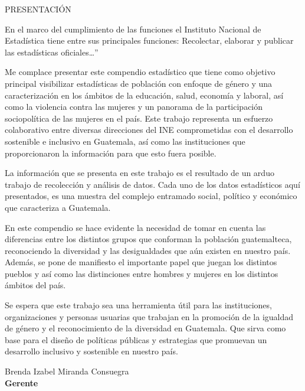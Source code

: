 \begin{center}
{\Bold \LARGE PRESENTACIÓN}\\[2cm]
\end{center}

En el marco del cumplimiento de las funciones el Instituto Nacional de Estadística tiene entre sus principales funciones: Recolectar, elaborar y publicar las estadísticas oficiales…”  

Me complace presentar este compendio estadístico que tiene como objetivo principal visibilizar estadísticas de población con enfoque de género y una caracterización en los ámbitos de la educación, salud, economía y laboral, así como la violencia contra las mujeres y un panorama de la participación sociopolítica de las mujeres en el país. Este trabajo representa un esfuerzo colaborativo entre diversas direcciones del INE comprometidas con el desarrollo sostenible e inclusivo en Guatemala, así como las instituciones que proporcionaron la información para que esto fuera posible. 

La información que se presenta en este trabajo es el resultado de un arduo trabajo de recolección y análisis de datos. Cada uno de los datos estadísticos aquí presentados, es una muestra del complejo entramado social, político y económico que caracteriza a Guatemala. 

En este compendio se hace evidente la necesidad de tomar en cuenta las diferencias entre los distintos grupos que conforman la población guatemalteca, reconociendo la diversidad y las desigualdades que aún existen en nuestro país. Además, se pone de manifiesto el importante papel que juegan los distintos pueblos y así como las distinciones entre hombres y mujeres en los distintos ámbitos del país. 

Se espera que este trabajo sea una herramienta útil para las instituciones, organizaciones y personas usuarias que trabajan en la promoción de la igualdad de género y el reconocimiento de la diversidad en Guatemala. Que sirva como base para el diseño de políticas públicas y estrategias que promuevan un desarrollo inclusivo y sostenible en nuestro país. 

\begin{center}
Brenda Izabel Miranda Consuegra\\
\textbf{Gerente}
\end{center}

